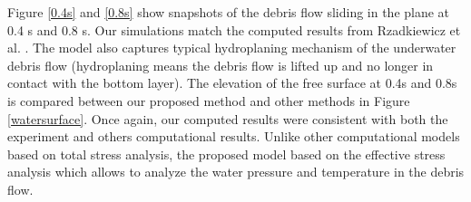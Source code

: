 \documentclass[preprint,12pt]{elsarticle}
\begin{document}
%
%
Figure \ref{0.4s} and  \ref{0.8s} show snapshots of the debris flow sliding in the plane at 0.4 s and 0.8 s. Our simulations match the computed results from Rzadkiewicz et al. \cite{Rzadkiewicz}. The model also captures typical hydroplaning mechanism of the underwater debris flow (hydroplaning means the debris flow is lifted up and no longer in contact with the bottom layer). The elevation of the free surface at 0.4s and 0.8s is compared between our proposed method and other methods in Figure \ref{watersurface}. Once again, our computed results were consistent with both the experiment and others computational results. Unlike other computational models based on total stress analysis, the proposed model based on the effective stress analysis which allows to analyze the water pressure  and temperature in the debris flow.\\
%
%
\end{document}
